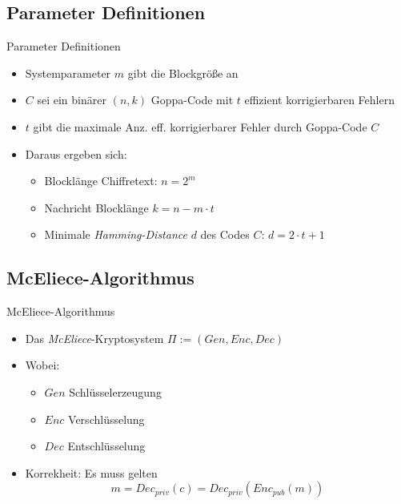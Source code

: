 \documentclass[11pt%
,aspectratio=169%
]{beamer}
\begin{document}
\subsection{Parameter Definitionen}
\begin{frame}{Parameter Definitionen}
    \begin{itemize}
        \item Systemparameter $m$ gibt die Blockgröße an
        \item $C$ sei ein binärer $(n,k)$ Goppa-Code mit $t$ effizient korrigierbaren Fehlern
        \item $t$ gibt die maximale Anz. eff. korrigierbarer Fehler durch Goppa-Code $C$
        \item Daraus ergeben sich:
        \begin{itemize}
            \item Blocklänge Chiffretext: $n = 2^m$
            \item Nachricht Blocklänge $k = n - m \cdot t$
            \item Minimale \emph{Hamming-Distance} $d$ des Codes $C$: $d = 2 \cdot t + 1$
        \end{itemize}
    \end{itemize}   
\end{frame}

\subsection{McEliece-Algorithmus}
\begin{frame}{McEliece-Algorithmus}
    \begin{itemize}
        \item Das \emph{McEliece}-Kryptosystem $\Pi := (Gen, Enc, Dec)$
        \item Wobei:
        \begin{itemize}
            \item $Gen$ Schlüsselerzeugung
            \item $Enc$ Verschlüsselung
            \item $Dec$ Entschlüsselung
        \end{itemize}
        \item Korrekheit: Es muss gelten
        $$
            m = Dec_{priv}(c) = Dec_{priv} (Enc_{pub}(m))
        $$
    \end{itemize}
\end{frame}
\end{document}
